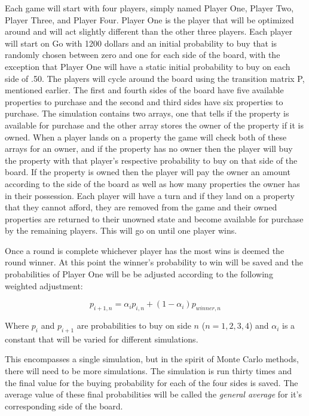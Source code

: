 \documentclass{article}
\begin{document}
Each game will start with four players, simply named Player One, Player Two, Player Three, and Player Four.  Player One is the player that will be optimized around and will act slightly different than the other three players.  Each player will start on Go with 1200 dollars and an initial probability to buy that is randomly chosen between zero and one for each side of the board, with the exception that Player One will have a static initial probability to buy on each side of .50.  The players will cycle around the board using the transition matrix P, mentioned earlier.  The first and fourth sides of the board have five available properties to purchase and the second and third sides have six properties to purchase.  The simulation contains two arrays, one that tells if the property is available for purchase and the other array stores the owner of the property if it is owned.  When a player lands on a property the game will check both of these arrays for an owner, and if the property has no owner then the player will buy the property with that player’s respective probability to buy on that side of the board.  If the property is owned then the player will pay the owner an amount according to the side of the board as well as how many properties the owner has in their possession.  Each player will have a turn and if they land on a property that they cannot afford, they are removed from the game and their owned properties are returned to their unowned state and become available for purchase by the remaining players.  This will go on until one player wins.  

Once a round is complete whichever player has the most wins is deemed the round winner.  At this point the winner’s probability to win will be saved and the probabilities of Player One will be be adjusted according to the following weighted adjustment:

\begin{equation}
    \label{probability_adjustment}
    p_{i+1,n} = \alpha_i p_{i,n} + (1-\alpha_i)p_{winner,n}
\end{equation}

Where $p_i$ and $p_{i+1}$ are probabilities to buy on side $n$ ($n = 1,2,3,4$) and $\alpha_i$ is a constant that will be varied for different simulations.

This encompasses a single simulation, but in the spirit of Monte Carlo methods, there will need to be more simulations.  The simulation is run thirty times and the final value for the buying probability for each of the four sides is saved.  The average value of these final probabilities will be called the \textit{general average} for it's corresponding side of the board.
\end{document}

